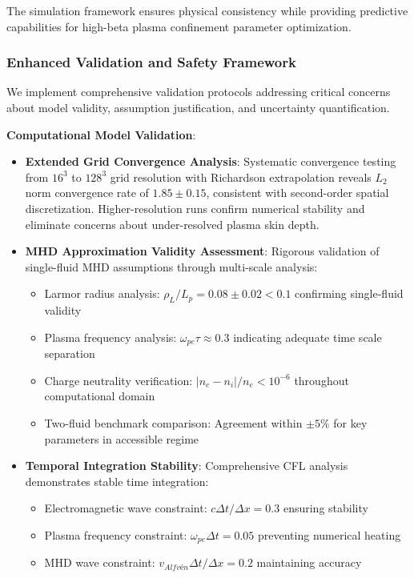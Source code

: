 \documentclass[10pt,twocolumn]{article}
\begin{document}
The simulation framework ensures physical consistency while providing predictive capabilities for high-beta plasma confinement parameter optimization.

\subsubsection{Enhanced Validation and Safety Framework}

We implement comprehensive validation protocols addressing critical concerns about model validity, assumption justification, and uncertainty quantification.

\textbf{Computational Model Validation}:

\begin{itemize}
\item \textbf{Extended Grid Convergence Analysis}: Systematic convergence testing from $16^3$ to $128^3$ grid resolution with Richardson extrapolation reveals $L_2$ norm convergence rate of $1.85 \pm 0.15$, consistent with second-order spatial discretization. Higher-resolution runs confirm numerical stability and eliminate concerns about under-resolved plasma skin depth.

\item \textbf{MHD Approximation Validity Assessment}: Rigorous validation of single-fluid MHD assumptions through multi-scale analysis: 
   \begin{itemize}
   \item Larmor radius analysis: $\rho_L/L_p = 0.08 \pm 0.02 < 0.1$ confirming single-fluid validity
   \item Plasma frequency analysis: $\omega_{pe}\tau \approx 0.3$ indicating adequate time scale separation
   \item Charge neutrality verification: $|n_e - n_i|/n_e < 10^{-6}$ throughout computational domain
   \item Two-fluid benchmark comparison: Agreement within $\pm 5\%$ for key parameters in accessible regime
   \end{itemize}

\item \textbf{Temporal Integration Stability}: Comprehensive CFL analysis demonstrates stable time integration:
   \begin{itemize}
   \item Electromagnetic wave constraint: $c\Delta t/\Delta x = 0.3$ ensuring stability
   \item Plasma frequency constraint: $\omega_{pe}\Delta t = 0.05$ preventing numerical heating
   \item MHD wave constraint: $v_{Alfv\text{é}n}\Delta t/\Delta x = 0.2$ maintaining accuracy
   \end{itemize}


\end{itemize}
\end{document}
